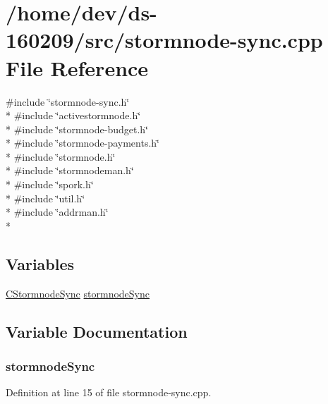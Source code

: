 \hypertarget{stormnode-sync_8cpp}{}\section{/home/dev/ds-\/160209/src/stormnode-\/sync.cpp File Reference}
\label{stormnode-sync_8cpp}
{\ttfamily \#include \char`\"{}stormnode-\/sync.\+h\char`\"{}}\\*
{\ttfamily \#include \char`\"{}activestormnode.\+h\char`\"{}}\\*
{\ttfamily \#include \char`\"{}stormnode-\/budget.\+h\char`\"{}}\\*
{\ttfamily \#include \char`\"{}stormnode-\/payments.\+h\char`\"{}}\\*
{\ttfamily \#include \char`\"{}stormnode.\+h\char`\"{}}\\*
{\ttfamily \#include \char`\"{}stormnodeman.\+h\char`\"{}}\\*
{\ttfamily \#include \char`\"{}spork.\+h\char`\"{}}\\*
{\ttfamily \#include \char`\"{}util.\+h\char`\"{}}\\*
{\ttfamily \#include \char`\"{}addrman.\+h\char`\"{}}\\*
\subsection*{Variables}
\begin{DoxyCompactItemize}
\item 
\hyperlink{class_c_stormnode_sync}{C\+Stormnode\+Sync} \hyperlink{stormnode-sync_8cpp_a4233fda53cfb60fd6ba208d981ac3fe7}{stormnode\+Sync}
\end{DoxyCompactItemize}


\subsection{Variable Documentation}
\hypertarget{stormnode-sync_8cpp_a4233fda53cfb60fd6ba208d981ac3fe7}{}
\subsubsection[{stormnode\+Sync}]{ stormnode\+Sync}\label{stormnode-sync_8cpp_a4233fda53cfb60fd6ba208d981ac3fe7}


Definition at line 15 of file stormnode-\/sync.\+cpp.


